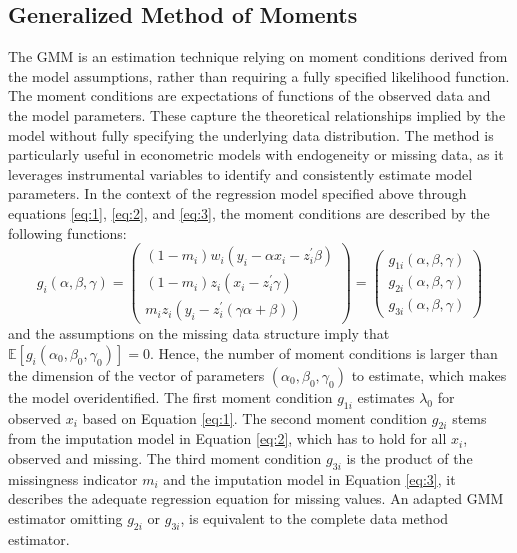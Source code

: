 \subsection{Generalized Method of Moments}
The GMM is an estimation technique relying on moment conditions derived from the model assumptions, rather than requiring a fully specified likelihood function.
The moment conditions are expectations of functions of the observed data and the model parameters.
These capture the theoretical relationships implied by the model without fully specifying the underlying data distribution.
The method is particularly useful in econometric models with endogeneity or missing data, as it leverages instrumental variables to identify and consistently estimate model parameters.
In the context of the regression model specified above through equations \eqref{eq:1}, \eqref{eq:2}, and \eqref{eq:3}, the moment conditions are described by the following functions:
\begin{equation}\label{eq:4}
    g_i(\alpha, \beta, \gamma) = \begin{pmatrix}
        (1-m_i)w_i(y_i - \alpha x_i - z_i^{\prime}\beta) \\
        (1-m_i)z_i (x_i - z_i^{\prime} \gamma) \\
        m_i z_i (y_i - z_i^{\prime} (\gamma \alpha + \beta))
    \end{pmatrix}
    = \begin{pmatrix}
        g_{1i}(\alpha, \beta, \gamma) \\
        g_{2i}(\alpha, \beta, \gamma) \\
        g_{3i}(\alpha, \beta, \gamma)
    \end{pmatrix}
\end{equation}
and the assumptions on the missing data structure imply that $\mathbb{E}[g_i(\alpha_0, \beta_0, \gamma_0)] = 0$.
Hence, the number of moment conditions is larger than the dimension of the vector of parameters $(\alpha_0, \beta_0, \gamma_0)$ to estimate, which makes the model overidentified.
The first moment condition $g_{1i}$ estimates $\lambda_0$ for observed $x_i$ based on Equation \eqref{eq:1}.
The second moment condition $g_{2i}$ stems from the imputation model in Equation \eqref{eq:2}, which has to hold for all $x_i$, observed and missing.
The third moment condition $g_{3i}$ is the product of the missingness indicator $m_i$ and the imputation model in Equation \eqref{eq:3}, it describes the adequate regression equation for missing values.
An adapted GMM estimator omitting $g_{2i}$ or $g_{3i}$, is equivalent to the complete data method estimator.


